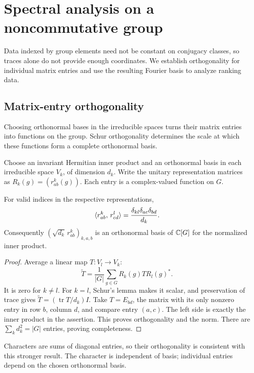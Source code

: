 \section{Spectral analysis on a noncommutative group}

Data indexed by group elements need not be constant on conjugacy classes, so
traces alone do not provide enough coordinates. We establish orthogonality
for individual matrix entries and use the resulting Fourier basis to analyze
ranking data.

\subsection{Matrix-entry orthogonality}

Choosing orthonormal bases in the irreducible spaces turns their matrix
entries into functions on the group. Schur orthogonality determines the
scale at which these functions form a complete orthonormal basis.

Choose an invariant Hermitian inner product and an orthonormal basis in
each irreducible space $V_k$, of dimension $d_k$. Write the unitary
representation matrices as $R_k(g)=(r_{ab}^k(g))$. Each entry is a
complex-valued function on $G$.


\begin{thm}
For valid indices in the respective representations,
\[
 \langle r_{ab}^k,\,r_{cd}^l\rangle
    =\frac{\delta_{kl}\delta_{ac}\delta_{bd}}{d_k}.
\]
Consequently $(\sqrt{d_k}\,r_{ab}^k)_{k,a,b}$ is an orthonormal basis
of $\mathbb{C}[G]$ for the normalized inner product.
\end{thm}
\begin{proof}
Average a linear map $T:V_l\to V_k$:
\begin{equation}
\label{eq-orth-functions-coord-interm}
 \widetilde T=\frac1{|G|}\sum_{g\in G}R_k(g)T R_l(g)^*.
\end{equation}
It is zero for $k\ne l$. For $k=l$, Schur's lemma makes it scalar,
and preservation of trace gives $\widetilde T=(\operatorname{tr}T/d_k)I$.
Take $T=E_{bd}$, the matrix with its only nonzero entry in row $b$,
column $d$, and compare entry $(a,c)$. The left side is exactly the
inner product in the assertion. This proves orthogonality and the norm.
There are $\sum_k d_k^2=|G|$ entries, proving completeness.
\end{proof}
Characters are sums of diagonal entries, so their orthogonality is
consistent with this stronger result. The character is independent of
basis; individual entries depend on the chosen orthonormal basis.

